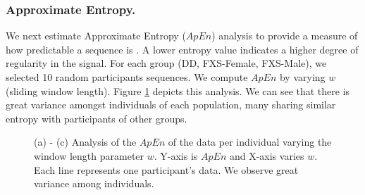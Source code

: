 \documentclass{llncs}
\begin{document}
\subsubsection{Approximate Entropy.} 
We next estimate Approximate Entropy ($ApEn$) analysis to provide a measure of how predictable a sequence is \cite{Restrepo:2014gs,entrophy} . A lower entropy value indicates a higher degree of regularity in the signal. For each group (DD, FXS-Female, FXS-Male), we selected 10 random participants sequences. We compute $ApEn$ by varying $w$ (sliding window length). Figure \ref{fig:individual_entropy} depicts this analysis. We can see that there is great variance amongst individuals of each population, many sharing similar entropy with participants of other groups. 
\begin{figure}[h]
  \centering
                    \hfill
             \hfill
           
             \caption{(a) - (c) Analysis of the $ApEn$ of the data per individual varying the window length parameter $w$. Y-axis is $ApEn$ and X-axis varies $w$. Each line represents one participant's data. We observe great variance among individuals.}
        \label{fig:individual_entropy}

\end{figure}
\end{document}
